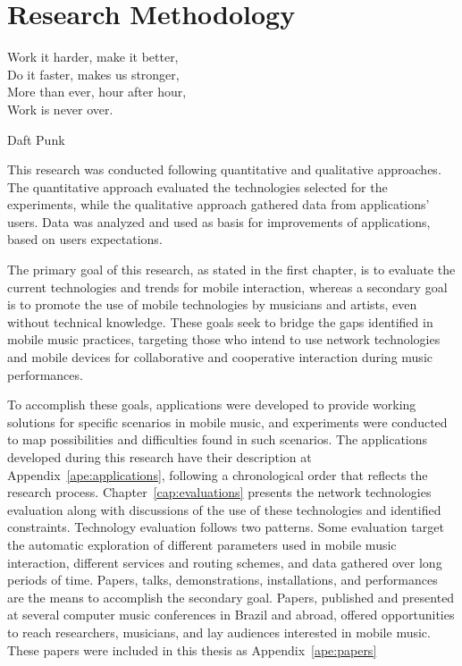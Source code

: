 \chapter{Research Methodology}
\label{cap:research}

 \epigraph{
 Work it harder, make it better,\\
 Do it faster, makes us stronger,\\
 More than ever, hour after hour,\\
 Work is never over.}
 {Daft Punk}

This research was conducted following quantitative and qualitative approaches.
The quantitative approach evaluated the technologies selected for the experiments, while the qualitative approach gathered data from applications' users.
Data was analyzed and used as basis for improvements of applications, based on users expectations.

The primary goal of this research, as stated in the first chapter, is to evaluate the current technologies and trends for mobile interaction, whereas 
a secondary goal is to promote the use of mobile technologies by musicians and artists, even without technical knowledge.
These goals seek to bridge the gaps identified in mobile music practices, targeting those who intend to use network technologies and mobile devices for collaborative and cooperative interaction during music performances.


To accomplish these goals, applications were developed to provide working solutions for specific scenarios in mobile music, and experiments were conducted to map possibilities and difficulties found in such scenarios.
The applications developed during this research have their description at Appendix~\ref{ape:applications}, following a chronological order that reflects the research process.
Chapter~\ref{cap:evaluations} presents the network technologies evaluation along with discussions of the use of these technologies and identified constraints.
Technology evaluation follows two patterns. 
Some evaluation target the automatic exploration of different parameters used in mobile music interaction, different services and routing schemes, and data gathered over long periods of time.
Papers, talks, demonstrations, installations, and performances are the means to accomplish the secondary goal.
Papers, published and presented at several computer music conferences in Brazil and abroad, offered opportunities to reach researchers, musicians, and lay audiences interested in mobile music.
These papers were included in this thesis as Appendix~\ref{ape:papers}

